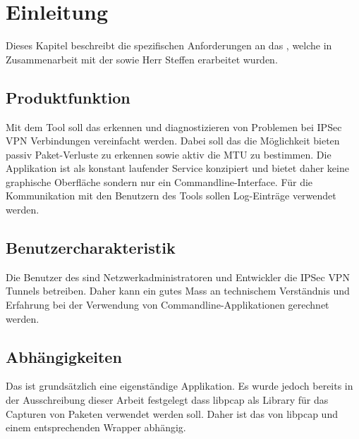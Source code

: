 \section{Einleitung}
\label{sec:Einleitung}

Dieses Kapitel beschreibt die spezifischen Anforderungen an das \tool, welche in Zusammenarbeit mit der \osag sowie Herr Steffen erarbeitet wurden.

\subsection{Produktfunktion}
Mit dem Tool soll das erkennen und diagnostizieren von Problemen bei \acs{IPSec} \acs{VPN} Verbindungen vereinfacht werden. Dabei soll das \tool die Möglichkeit bieten passiv Paket-Verluste zu erkennen sowie aktiv die \acs{MTU} zu bestimmen. Die Applikation ist als konstant laufender Service konzipiert und bietet daher keine graphische Oberfläche sondern nur ein Commandline-Interface. Für die Kommunikation mit den Benutzern des Tools sollen Log-Einträge verwendet werden.

\subsection{Benutzercharakteristik}
Die Benutzer des \tool sind Netzwerkadministratoren und Entwickler die \acs{IPSec} \acs{VPN} Tunnels betreiben. Daher kann ein gutes Mass an technischem Verständnis und Erfahrung bei der Verwendung von Commandline-Applikationen gerechnet werden.

\subsection{Abhängigkeiten}
Das \tool ist grundsätzlich eine eigenständige Applikation. Es wurde jedoch bereits in der Ausschreibung dieser Arbeit festgelegt dass libpcap als Library für das Capturen von Paketen verwendet werden soll. Daher ist das \tool von libpcap und einem entsprechenden Wrapper abhängig.